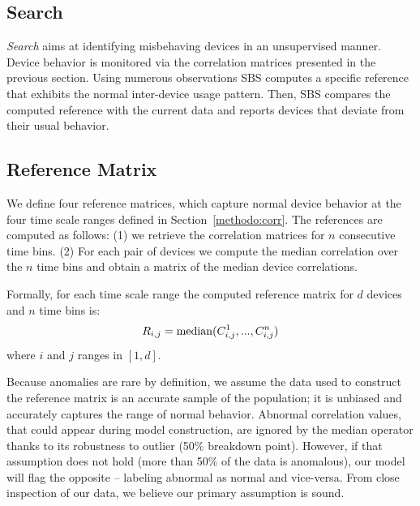 \subsection{Search}\label{methodo:ano}
\emph{Search} aims at identifying misbehaving devices in an unsupervised manner.
Device behavior is monitored via the correlation matrices presented in the previous section.
Using numerous observations SBS computes a specific reference that exhibits the normal inter-device usage pattern.
Then, SBS compares the computed reference with the current data and reports devices that deviate from their usual 
behavior.

\subsection{Reference Matrix}
We define four reference matrices, which capture normal device behavior at the four time scale ranges defined in 
Section~\ref{methodo:corr}.
The references are computed as follows: (1) we retrieve the correlation matrices for $n$ consecutive time bins. (2) For each pair of devices we compute the median correlation 
over the $n$ time bins and obtain a matrix of the median device correlations.

Formally, for each time scale range the computed reference matrix for $d$ devices and $n$ time bins is:
\[R_{i,j} =  \operatorname{median}(C^1_{i,j},...,C^n_{i,j})\]
where $i$ and $j$ ranges in $[1,d]$.

Because anomalies are rare by definition, we assume the data used to construct the reference matrix
is an accurate sample of the population; it is unbiased and accurately captures the range of normal behavior.
Abnormal correlation values, that could appear during model construction, %
are ignored by the median operator thanks to its robustness to outlier (50\% breakdown point).  
However, if that assumption does not hold (more than 50\% of the data is anomalous), our model will flag the opposite -- labeling abnormal as normal and vice-versa.
From close inspection of our data, we believe our primary assumption is sound.



